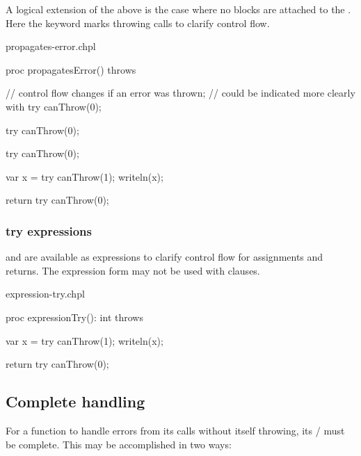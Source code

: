 A logical extension of the above is the case where no  blocks
are attached to the . Here the  keyword marks throwing
calls to clarify control flow.

\begin{chapelexample}{propagates-error.chpl}
\begin{chapel}
proc propagatesError() throws {
  // control flow changes if an error was thrown;
  // could be indicated more clearly with try
  canThrow(0);

  try canThrow(0);

  try {
    canThrow(0);
  }

  var x = try canThrow(1);
  writeln(x);

  return try canThrow(0);
}
\end{chapel}
\begin{chapelpost}
\end{chapelpost}
\begin{chapeloutput}
\end{chapeloutput}
\end{chapelexample}


\subsubsection{try expressions}
\label{try_expressions}

 and  are available as expressions to clarify control flow
for assignments and returns. The expression form may not be used with
 clauses.

\begin{chapelexample}{expression-try.chpl}
\begin{chapel}
proc expressionTry(): int throws {
  var x = try canThrow(1);
  writeln(x);

  return try canThrow(0);
}
\end{chapel}
\begin{chapelpost}
\end{chapelpost}
\begin{chapeloutput}
\end{chapeloutput}
\end{chapelexample}

\subsection{Complete handling}
\label{Complete_handling}

For a function to handle errors from its calls without itself throwing,
its / must be complete. This may be accomplished
in two ways:

